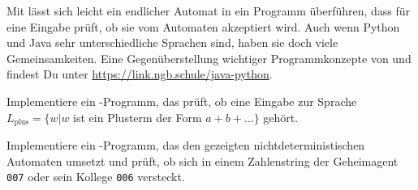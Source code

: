 \documentclass[fontsize=10pt, a4paper, ngerman]{scrartcl}
\begin{document}
\ReiheTitel

Mit  lässt sich leicht ein endlicher Automat in ein Programm
überführen, dass für eine Eingabe prüft, ob sie vom Automaten akzeptiert wird.
Auch wenn Python und Java sehr unterschiedliche Sprachen sind, haben sie doch
viele Gemeinsamkeiten. Eine Gegenüberstellung wichtiger Programmkonzepte von
 und  findest Du unter
\url{https://link.ngb.schule/java-python}.


\begin{aufgabe}[subtitle=Implementierung eines DEA: Plusterme]
\label{aufg:py-dea}
Implementiere ein -Programm, das prüft, ob eine Eingabe zur
Sprache $L_\text{plus} = \{ w | w$ ist ein Plusterm der Form
$a + b + \dots \}$ gehört.
\begin{center}
	\begin{transitiongraph}[fa]

	\end{transitiongraph}
\end{center}
\end{aufgabe}

\begin{aufgabe}[subtitle=Implementierung eines NEA: Bond]
\label{aufg:py-nea}
Implementiere ein -Programm, das den gezeigten
nichtdeterministischen Automaten umsetzt und prüft, ob sich in einem
Zahlenstring der Geheimagent \texttt{007} oder sein Kollege \texttt{006}
versteckt.
\begin{center}
	\begin{transitiongraph}[fa]

	\end{transitiongraph}
\end{center}
\end{aufgabe}
\end{document}
